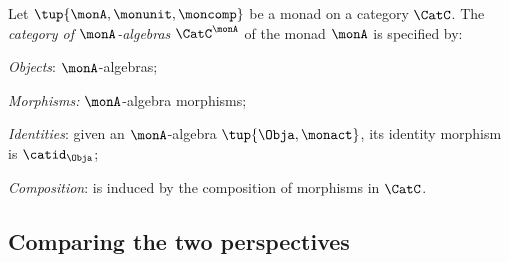 \begin{ctdefinition}
    \label{def:catofmonadalgebras}
    Let $\tup{\monA, \monunit, \moncomp}$ be a monad on a category $\CatC$.
    The \emph{category of $\monA$-algebras} $\CatC^\monA$ of the monad $\monA$ is specified by:
    \begin{compactenum}
        \item \emph{Objects}: $\monA$-algebras;
        \item \emph{Morphisms:} $\monA$-algebra morphisms;
        \item \emph{Identities}: given an $\monA$-algebra $\tup{\Obja, \monact}$, its identity morphism is $\catid_\Obja$;
        \item \emph{Composition}: is induced by the composition of morphisms in $\CatC$.
    \end{compactenum}
\end{ctdefinition}

\subsection{Comparing the two perspectives}


